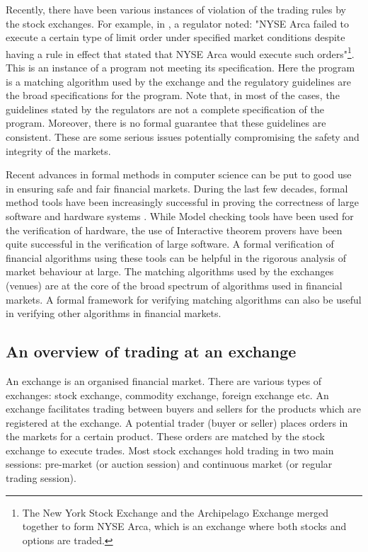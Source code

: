 \documentclass[a4paper,UKenglish,cleveref, autoref]{lipics-v2019}
\begin{document}
Recently, there have been various instances \cite{nyse1, nyse2, nse} of violation of the trading rules by the stock exchanges. For example, in \cite{nyse1}, a regulator noted: "NYSE Arca failed to execute a certain type of limit order under specified market conditions despite having a rule in effect that stated that NYSE Arca would execute such orders"\footnote{The New York Stock Exchange and the Archipelago Exchange merged together to form NYSE Arca, which is an exchange where both stocks and options are traded.}. This is an instance of a program not meeting its specification. Here the program is a matching algorithm used by the exchange and the regulatory guidelines are the broad specifications for the program. Note that, in most of the cases, the guidelines stated by the regulators are not a complete specification of the program. Moreover, there is no formal guarantee that these  guidelines are consistent. These are some serious issues potentially compromising the safety and integrity of the markets. 

Recent advances in formal methods in computer science can be put to good use in ensuring safe and fair financial markets. During the last few decades, formal method tools have been increasingly successful in proving the correctness of large software and hardware systems \cite{seqcir,blast,compcert,sel4}. While Model checking tools have been used for the verification of hardware, the use of Interactive theorem provers have been quite successful in the verification of large software. A formal verification of financial algorithms using these tools can be helpful in the rigorous analysis of market behaviour at large. The matching algorithms used by the exchanges (venues) are at the core of the broad spectrum of algorithms used in financial markets. A formal framework for verifying matching algorithms can also be useful in verifying other algorithms in financial markets. 

\subsection{An overview of trading at an exchange}

An exchange is an organised financial market. There are various types of exchanges: stock exchange, commodity exchange, foreign exchange etc. An exchange facilitates trading between buyers and sellers for the products which are registered at the exchange. A potential trader (buyer or seller) places orders in the markets for a certain product. These orders are matched by the stock exchange to execute trades.  Most stock exchanges hold trading in two main sessions: pre-market (or auction session) and continuous  market (or regular trading session). 
\end{document}
